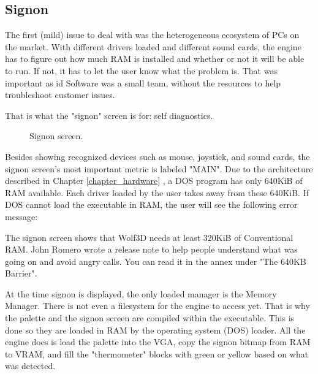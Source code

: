 \documentclass[book.tex]{subfiles}
\begin{document}
\subsection{Signon}
The first (mild) issue to deal with was the heterogeneous ecosystem of PCs on the market. With different drivers loaded and different sound cards, the engine has to figure out how much RAM is installed and whether or not it will be able to run. If not, it has to let the user know what the problem is. That was important as id Software was a small team, without the resources to help troubleshoot customer issues.\\
\par
That is what the "signon" screen is for: self diagnostics. 
\par
\begin{figure}[H]
\centering
{}
\caption{Signon screen.}
\end{figure}
\par
Besides showing recognized devices such as mouse, joystick, and sound cards, the signon screen's most important metric is labeled "MAIN". Due to the architecture described in Chapter \ref{chapter_hardware} , a DOS program has only 640KiB of RAM available. Each driver loaded by the user takes away from these 640KiB. If DOS cannot load the executable in RAM, the user will see the following error message:\\
\par 
\begin{minipage}{\textwidth}

\end{minipage}
\par
The signon screen shows that Wolf3D needs at least 320KiB of Conventional RAM. John Romero wrote a release note to help people understand what was going on and avoid angry calls. You can read it in the annex under "The 640KB Barrier".\\
\par 
At the time signon is displayed, the only loaded manager is the Memory Manager. There is not even a filesystem for the engine to access yet. That is why the palette and the signon screen are compiled within the executable. This is done so they are loaded in RAM by the operating system (DOS) loader. All the engine does is load the palette into the VGA, copy the signon bitmap from RAM to VRAM, and fill the "thermometer" blocks with green or yellow based on what was detected.\\
\par
\end{document}
